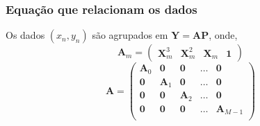 \documentclass[a4paper,10pt]{article}
\begin{document}
\subsubsection{Equação que relacionam os dados }
\label{subsubsec:partz}
Os dados $(x_n,y_n)$ são agrupados em $\mathbf{Y}=\mathbf{A}\mathbf{P}$, onde,
\begin{equation}
\mathbf{A}_m =\left(\begin{matrix}
\mathbf{X}_m^3 & \mathbf{X}_m^2 & \mathbf{X}_m & \mathbf{1}
\end{matrix}\right)
\end{equation}
\begin{equation}
\mathbf{A} =\left(\begin{matrix}
\mathbf{A}_0 & \mathbf{0}   & \mathbf{0}   & \dots & \mathbf{0} \\
\mathbf{0}   & \mathbf{A}_1 & \mathbf{0}   & \dots & \mathbf{0} \\
\mathbf{0}   & \mathbf{0}   & \mathbf{A}_2 & \dots & \mathbf{0} \\
\mathbf{0}   & \mathbf{0}   & \mathbf{0}   & \dots & \mathbf{A}_{M-1} \\
\end{matrix}\right)
\end{equation}
\end{document}

